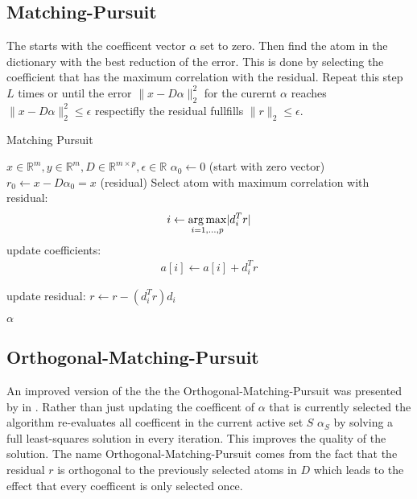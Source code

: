 \subsection{Matching-Pursuit}
\label{sec:mp}

The  starts with the coefficent vector $\alpha$ set to zero. Then find the atom in the dictionary with the best reduction of the error.
This is done by selecting the coefficient that has the maximum correlation with the residual. 
Repeat this step $L$ times or until the error $\lVert x - D\alpha \rVert^{2}_{2}$ for the curernt $\alpha$ reaches $\lVert x - D\alpha \rVert^{2}_{2} \leq \epsilon$ respectifly the residual fullfills $\lVert r \rVert_2 \leq \epsilon$.


\begin{algorithm}
\caption{Matching Pursuit}
\label{alg:mp}
\begin{algorithmic}[1]
\REQUIRE $x \in \mathbb{R}^m, y \in \mathbb{R}^m, D \in \mathbb{R}^{m\times p}, \epsilon \in \mathbb{R}$
\STATE $\alpha_0 \gets 0$ (start with zero vector)
\STATE $r_0 \gets x-D\alpha_0 = x$ (residual) 
\STATE Select atom with maximum correlation with residual: 
\begin{equation*}
i \gets \operatorname*{arg\,max}_{i=1,...,p} \lvert d_i^Tr \rvert
\end{equation*}
\STATE update coefficients: 
\begin{align}
a[i]  \gets a[i] + d_i^Tr \label{eq:mp_update}
\end{align}

\STATE update residual: $r \gets r - \left(d_i^Tr\right)d_i$

\ENDWHILE
\RETURN $\alpha$
\end{algorithmic}
\end{algorithm}
\subsection{Orthogonal-Matching-Pursuit}
\label{sec:omp}

An improved version of the  the the Orthogonal-Matching-Pursuit  was presented by in \cite{Pati1993}.
Rather than just updating the coefficent of $\alpha$ that is currently selected  the algorithm re-evaluates all coefficent in the current active set $S$ 
 $\alpha_S$ by solving a full least-squares solution in every iteration. This improves the quality of the solution. \cite{OMP}
The name Orthogonal-Matching-Pursuit comes from the fact that the residual $r$ is orthogonal to the previously selected atoms in $D$ which leads to the effect that every coefficent is only selected once.



